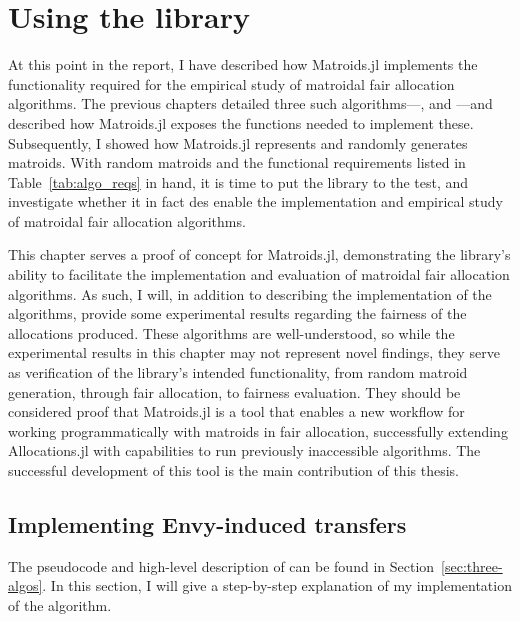 \chapter{Using the library}
\label{chap:yankee-swap}
At this point in the report, I have described how Matroids.jl implements the functionality required for the empirical study of matroidal fair allocation algorithms. The previous chapters detailed three such algorithms---,  and ---and described how Matroids.jl exposes the functions needed to implement these. Subsequently, I showed how Matroids.jl represents and randomly generates matroids. With random matroids and the functional requirements listed in Table~\ref{tab:algo_reqs} in hand, it is time to put the library to the test, and investigate whether it in fact des enable the implementation and empirical study of matroidal fair allocation algorithms.

This chapter serves a proof of concept for Matroids.jl, demonstrating the library's ability to facilitate the implementation and evaluation of matroidal fair allocation algorithms. As such, I will, in addition to describing the implementation of the algorithms, provide some experimental results regarding the fairness of the allocations produced. These algorithms are well-understood, so while the experimental results in this chapter may not represent novel findings, they serve as verification of the library's intended functionality, from random matroid generation, through fair allocation, to fairness evaluation. They should be considered proof that Matroids.jl is a tool that enables a new workflow for working programmatically with matroids in fair allocation, successfully extending Allocations.jl with capabilities to run previously inaccessible algorithms. The successful development of this tool is the main contribution of this thesis.

\section{Implementing Envy-induced transfers}
The pseudocode and high-level description of  can be found in Section~\ref{sec:three-algos}. In this section, I will give a step-by-step explanation of my implementation of the algorithm.

